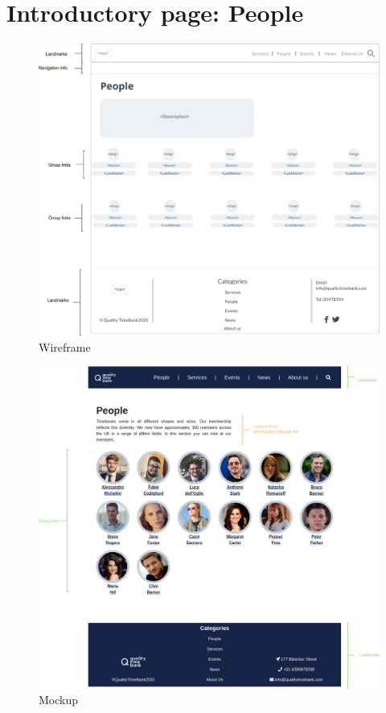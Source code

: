 \documentclass[a4paper, 11pt, parskip=half, headsepline]{scrreprt}
\begin{document}
\section{Introductory page: People}

\begin{figure}[H]
    \centering
    \includegraphics[width=1\linewidth, keepaspectratio]{wireframes/Introductory-People}
    \caption{Wireframe}
\end{figure}

\begin{figure}[H]
    \centering
    \includegraphics[width=1\linewidth, keepaspectratio]{mockups/ConcretePeople}
    \caption{Mockup}
\end{figure}
\end{document}

